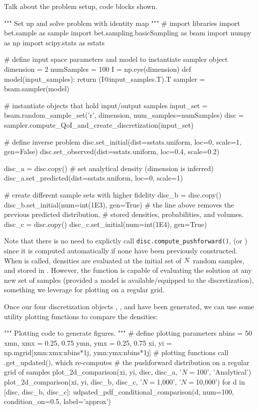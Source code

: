 
Talk about the problem setup, code blocks shown.

\begin{python}
"""
Set up and solve problem with identity map
"""
# import libraries
import bet.sample as sample
import bet.sampling.basicSampling as bsam
import numpy as np
import scipy.stats as sstats

# define input space parameters and model to instantiate sampler object
dimension = 2
numSamples = 100
I = np.eye(dimension)
def model(input_samples):
        return (I@input_samples.T).T
sampler = bsam.sampler(model)

# instantiate objects that hold input/output samples
input_set = bsam.random_sample_set('r', dimension, num_samples=numSamples)
disc = sampler.compute_QoI_and_create_discretization(input_set)

# define inverse problem
disc.set_initial(dist=sstats.uniform, loc=0, scale=1, gen=False)
disc.set_observed(dist=sstats.uniform, loc=0.4, scale=0.2)

disc_a = disc.copy()
# set analytical density (dimension is inferred)
disc_a.set_predicted(dist=sstats.uniform, loc=0, scale=1)

# create different sample sets with higher fidelity
disc_b = disc.copy()
disc_b.set_initial(num=int(1E3), gen=True)
# the line above removes the previous predicted distribution,
#     stored densities, probabilities, and volumes.
disc_c = disc.copy()
disc_c.set_initial(num=int(1E4), gen=True)
\end{python}

Note that there is no need to explictly call {\tt disc.compute\_pushforward()}, (or ) since it is computed automatically if none have been previously constructed.
When  is called, densities are evaluated at the initial set of $N$ random samples, and stored in .
However, the function  is capable of evaluating the solution at any new set of samples (provided a model is available/equipped to the discretization), something we leverage for plotting on a regular grid.

Once our four discretization objects , ,  and  have been generated, we can use some utility plotting functions to compare the densities:

\begin{python}
"""
Plotting code to generate figures.
"""
# define plotting parameters
nbins = 50
xmn, xmx = 0.25, 0.75
ymn, ymx = 0.25, 0.75
xi, yi = np.mgrid[xmn:xmx:nbins*1j, ymn:ymx:nbins*1j]
# plotting functions call .get_updated(), which re-computes
# the pushforward distribution on a regular grid of samples
plot_2d_comparison(xi, yi, disc, disc_a, '$N=$100', 'Analytical')
plot_2d_comparison(xi, yi, disc_b, disc_c, '$N=$1,000', '$N=$10,000')
for d in [disc, disc_b, disc_c]:
    udpated_pdf_conditional_comparison(d, num=100, condition_on=0.5, label='approx')
\end{python}

